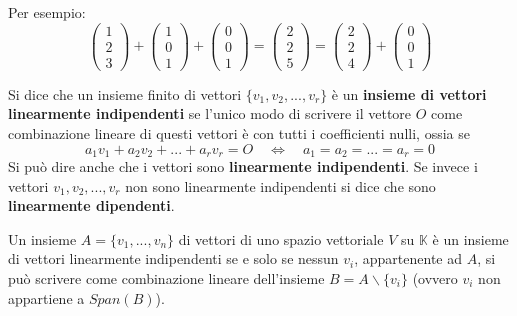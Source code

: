 \begin{example}
	Per esempio:
	\begin{equation*}
		\begin{pmatrix}
			1 \\ 2 \\ 3
		\end{pmatrix} +
		\begin{pmatrix}
			1 \\ 0 \\ 1
		\end{pmatrix} +
		\begin{pmatrix}
			0 \\ 0 \\ 1
		\end{pmatrix} =
		\begin{pmatrix}
			2 \\ 2 \\ 5
		\end{pmatrix} =
		\begin{pmatrix}
			2 \\ 2 \\ 4
		\end{pmatrix} +
		\begin{pmatrix}
			0 \\ 0 \\ 1
		\end{pmatrix}
	\end{equation*}
\end{example}

\begin{definition}
	Si dice che un insieme finito di vettori $\{v_1, v_2, ..., v_r\}$ \`e
	un \textbf{insieme di vettori linearmente indipendenti} se l'unico
	modo di scrivere il vettore $O$ come combinazione lineare di questi
	vettori \`e con tutti i coefficienti nulli, ossia se
	\begin{equation*}
		a_1 v_1 + a_2 v_2 + ... + a_r v_r = O \quad \Leftrightarrow \quad
		a_1 = a_2 = ... = a_r = 0
	\end{equation*}
	Si pu\`o dire anche che i vettori sono \textbf{linearmente indipendenti}.
	Se invece i vettori $v_1, v_2, ..., v_r$ non sono linearmente indipendenti
	si dice che sono \textbf{linearmente dipendenti}.
\end{definition}

\begin{proposition}
	Un insieme $A = \{v_1, ..., v_n\}$ di vettori di uno spazio
	vettoriale $V$ su $\mathbb{K}$ \`e un insieme di vettori linearmente
	indipendenti se e solo se nessun $v_i$, appartenente ad $A$, si pu\`o
	scrivere come combinazione lineare dell'insieme
	$B = A \backslash \{v_i\}$ (ovvero $v_i$ non appartiene a $Span(B)$).
\end{proposition}


